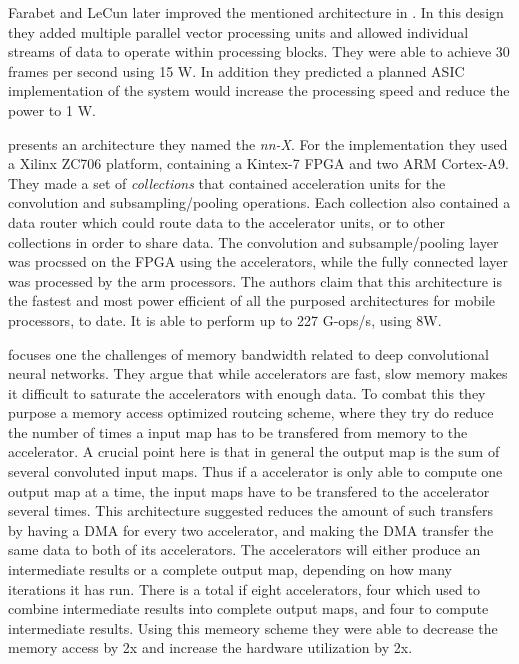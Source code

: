 Farabet and LeCun later improved the mentioned architecture in \cite{Farabet2010}. In this design they added multiple parallel vector processing units and allowed individual
streams of data to operate within processing blocks. They were able to achieve 30 frames per second using 15 W. In addition they predicted a planned ASIC implementation of the system would increase the processing speed and reduce the power to 1 W. 
 

\cite{Paper} presents an architecture they named the \textit{nn-X}. For the implementation they used a Xilinx ZC706 platform, containing a Kintex-7 FPGA and two ARM Cortex-A9. They made a set of \textit{collections} that contained acceleration units for the convolution and subsampling/pooling operations. Each collection also contained a data router which could route data to the accelerator units, or to other collections in order to share data. The convolution and subsample/pooling layer was procssed on the FPGA using the accelerators, while the fully connected layer was processed by the arm processors. The authors claim that this architecture is the fastest and most power efficient of all the purposed architectures for mobile processors, to date. It is able to perform up to 227 G-ops/s, using 8W.  

\cite{INSERT_PAPER} focuses one the challenges of memory bandwidth related to deep convolutional neural networks. They argue that while accelerators are fast, slow memory makes it difficult to saturate the accelerators with enough data. To combat this they purpose a memory access optimized routcing scheme, where they try do reduce the number of times a input map has to be transfered from memory to the accelerator. A crucial point here is that in general the output map is the sum of several convoluted input maps. Thus if a accelerator is only able to compute one output map at a time, the input maps have to be transfered to the accelerator several times. This architecture suggested reduces the amount of such transfers by having a DMA for every two accelerator, and making the DMA transfer the same data to both of its accelerators. The accelerators will either produce an intermediate results or a complete output map, depending on how many iterations it has run. There is a total if eight accelerators, four which used to combine intermediate results into complete output maps, and four to compute intermediate results. Using this memeory scheme they were able to decrease the memory access by 2x and increase the hardware utilization by 2x. 

